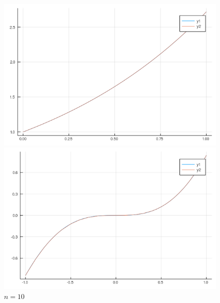 \documentclass[11pt, a4paper]{article}
\begin{document}
\begin{figure}[H]
        \begin{minipage}{0.5\textwidth}
            \caption{$n=10$}
            \centering
            \includegraphics[width=\linewidth]{plot-5_a_n10}
        \end{minipage}
        \begin{minipage}{0.5\textwidth}
            \caption{$n=10$}
            \centering
            \includegraphics[width=\linewidth]{plot-5_b_n10}
        \end{minipage}
        

\end{figure}
\end{document}

